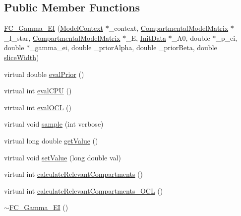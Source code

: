 \subsection*{Public Member Functions}
\begin{DoxyCompactItemize}
\item 
\hyperlink{classSpatialSEIR_1_1FC__Gamma__EI_a6d22d782fa070915060842101380c2af}{F\-C\-\_\-\-Gamma\-\_\-\-E\-I} (\hyperlink{classSpatialSEIR_1_1ModelContext}{Model\-Context} $\ast$\-\_\-context, \hyperlink{classSpatialSEIR_1_1CompartmentalModelMatrix}{Compartmental\-Model\-Matrix} $\ast$\-\_\-\-I\-\_\-star, \hyperlink{classSpatialSEIR_1_1CompartmentalModelMatrix}{Compartmental\-Model\-Matrix} $\ast$\-\_\-\-E, \hyperlink{classSpatialSEIR_1_1InitData}{Init\-Data} $\ast$\-\_\-\-A0, double $\ast$\-\_\-p\-\_\-ei, double $\ast$\-\_\-gamma\-\_\-ei, double \-\_\-prior\-Alpha, double \-\_\-prior\-Beta, double \hyperlink{classSpatialSEIR_1_1FullConditional_a150ee031af8d086ad0a04b13630a110f}{slice\-Width})
\item 
virtual double \hyperlink{classSpatialSEIR_1_1FC__Gamma__EI_a001e6dacce9fc05d2db7217349f0f31f}{eval\-Prior} ()
\item 
virtual int \hyperlink{classSpatialSEIR_1_1FC__Gamma__EI_ad04e240632b08359ae6d924d6d88fdde}{eval\-C\-P\-U} ()
\item 
virtual int \hyperlink{classSpatialSEIR_1_1FC__Gamma__EI_a30bbe6436e31914a36042488bd0ecd29}{eval\-O\-C\-L} ()
\item 
virtual void \hyperlink{classSpatialSEIR_1_1FC__Gamma__EI_a33e0d2d52a85669f64fe058292ece1f8}{sample} (int verbose)
\item 
virtual long double \hyperlink{classSpatialSEIR_1_1FC__Gamma__EI_ad33d614b75ea81d0a34eecbcec2fd406}{get\-Value} ()
\item 
virtual void \hyperlink{classSpatialSEIR_1_1FC__Gamma__EI_af1593c1841cea3c44e69d35af9640304}{set\-Value} (long double val)
\item 
virtual int \hyperlink{classSpatialSEIR_1_1FC__Gamma__EI_ab2ac7a466661c568cf20ba89bced4ac2}{calculate\-Relevant\-Compartments} ()
\item 
virtual int \hyperlink{classSpatialSEIR_1_1FC__Gamma__EI_a1a10b7a7b3f0aa18af9bc60dcf17c150}{calculate\-Relevant\-Compartments\-\_\-\-O\-C\-L} ()
\item 
\hyperlink{classSpatialSEIR_1_1FC__Gamma__EI_ac6795a381b58c3feb9b82a190bfd6b5a}{$\sim$\-F\-C\-\_\-\-Gamma\-\_\-\-E\-I} ()
\end{DoxyCompactItemize}
